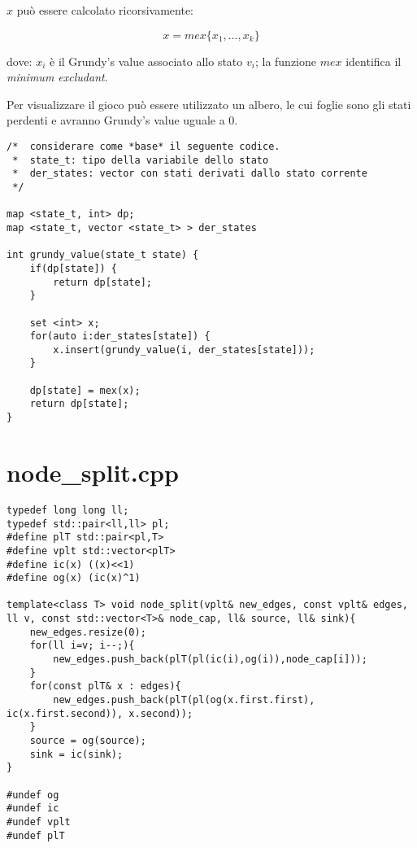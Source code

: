 \documentclass[a4paper,landscape,8pt]{extarticle}
\begin{document}
\begin{multicols}{3}
$x$ può essere calcolato ricorsivamente:

\[
    x = mex\{x_1, ..., x_k\}
\]

dove: $x_i$ è il Grundy's value associato allo stato $v_i$; la funzione $mex$
identifica il \emph{minimum excludant}.

Per visualizzare il gioco può essere utilizzato un albero, le cui foglie sono
gli stati perdenti e avranno Grundy's value uguale a $0$.

\begin{lstlisting}
/*  considerare come *base* il seguente codice.
 *  state_t: tipo della variabile dello stato
 *  der_states: vector con stati derivati dallo stato corrente
 */

map <state_t, int> dp;
map <state_t, vector <state_t> > der_states

int grundy_value(state_t state) {
    if(dp[state]) {
        return dp[state];
    }

    set <int> x;
    for(auto i:der_states[state]) {
        x.insert(grundy_value(i, der_states[state]));
    }

    dp[state] = mex(x);
    return dp[state];
}
\end{lstlisting}

\section*{node\_split.cpp}

\begin{lstlisting}
typedef long long ll;
typedef std::pair<ll,ll> pl;
#define plT std::pair<pl,T>
#define vplt std::vector<plT>
#define ic(x) ((x)<<1)
#define og(x) (ic(x)^1)

template<class T> void node_split(vplt& new_edges, const vplt& edges, ll v, const std::vector<T>& node_cap, ll& source, ll& sink){
    new_edges.resize(0);
    for(ll i=v; i--;){
        new_edges.push_back(plT(pl(ic(i),og(i)),node_cap[i]));
    }
    for(const plT& x : edges){
        new_edges.push_back(plT(pl(og(x.first.first), ic(x.first.second)), x.second));
    }
    source = og(source);
    sink = ic(sink);
}

#undef og
#undef ic
#undef vplt
#undef plT
\end{lstlisting}

%


\end{multicols}
\end{document}
